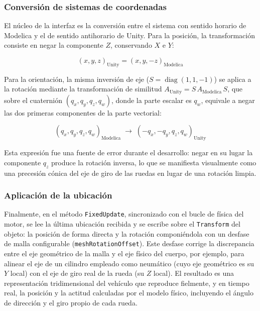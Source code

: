 \subsubsection*{Conversión de sistemas de coordenadas}

El núcleo de la interfaz es la conversión entre el sistema con sentido horario de Modelica y el de sentido antihorario de Unity. Para la posición, la transformación consiste en negar la componente $Z$, conservando $X$ e $Y$:

\begin{equation}
    (x, y, z)_\text{Unity} = (x, y, -z)_\text{Modelica}
\end{equation}

Para la orientación, la misma inversión de eje ($S = \operatorname{diag}(1, 1, -1)$) se aplica a la rotación mediante la transformación de similitud $A_\text{Unity} = S\,A_\text{Modelica}\,S$, que sobre el cuaternión $(q_x, q_y, q_z, q_w)$, donde la parte escalar es $q_w$, equivale a negar las dos primeras componentes de la parte vectorial:

\begin{equation}
    (q_x, q_y, q_z, q_w)_\text{Modelica} \;\longrightarrow\; (-q_x, -q_y, q_z, q_w)_\text{Unity}
\end{equation}

Esta expresión fue una fuente de error durante el desarrollo: negar en su lugar la componente $q_z$ produce la rotación inversa, lo que se manifiesta visualmente como una precesión cónica del eje de giro de las ruedas en lugar de una rotación limpia.

\subsubsection*{Aplicación de la ubicación}

Finalmente, en el método \verb|FixedUpdate|, sincronizado con el bucle de física del motor, se lee la última ubicación recibida y se escribe sobre el \verb|Transform| del objeto: la posición de forma directa y la rotación componiéndola con un desfase de malla configurable (\verb|meshRotationOffset|). Este desfase corrige la discrepancia entre el eje geométrico de la malla y el eje físico del cuerpo, por ejemplo, para alinear el eje de un cilindro empleado como neumático (cuyo eje geométrico es su $Y$ local) con el eje de giro real de la rueda (su $Z$ local). El resultado es una representación tridimensional del vehículo que reproduce fielmente, y en tiempo real, la posición y la actitud calculadas por el modelo físico, incluyendo el ángulo de dirección y el giro propio de cada rueda.

